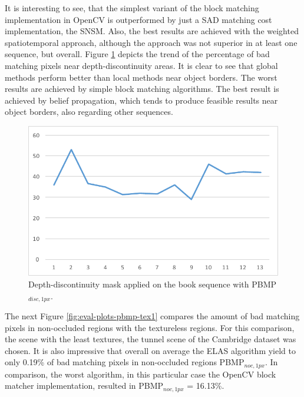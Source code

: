 \noindent It is interesting to see, that the simplest variant of the block matching implementation in OpenCV is outperformed by just a SAD matching cost implementation, the SNSM.
Also, the best results are achieved with the weighted spatiotemporal approach, although the approach was not superior in at least one sequence, but overall.
\newline\newline\noindent Figure \ref{fig:eval-plots-pbmp-disc1} depicts the trend of the percentage of bad matching pixels near depth-discontinuity areas.
It is clear to see that global methods perform better than local methods near object borders.
The worst results are achieved by simple block matching algorithms.
The best result is achieved by belief propagation, which tends to produce feasible results near object borders, also regarding other sequences.

\begin{figure}[h!]
\centering
\includegraphics[width=1.0\textwidth]{src/images/evaluation/plots/01-book-pbmp-disc-1.pdf}
\caption[Chart of depth-discontinuity mask]{Depth-discontinuity mask applied on the book sequence with PBMP$_{disc,1px}$.}
\label{fig:eval-plots-pbmp-disc1}
\end{figure}

\noindent The next Figure \ref{fig:eval-plots-pbmp-tex1} compares the amount of bad matching pixels in non-occluded regions with the textureless regions.
For this comparison, the scene with the least textures, the tunnel scene of the Cambridge dataset was chosen.
It is also impressive that overall on average the ELAS algorithm yield to only 0.19\% of bad matching pixels in non-occluded regions PBMP$_{noc,1px}$.
In comparison, the worst algorithm, in this particular case the OpenCV block matcher implementation, resulted in PBMP$_{noc,1px}$ = 16.13\%.

